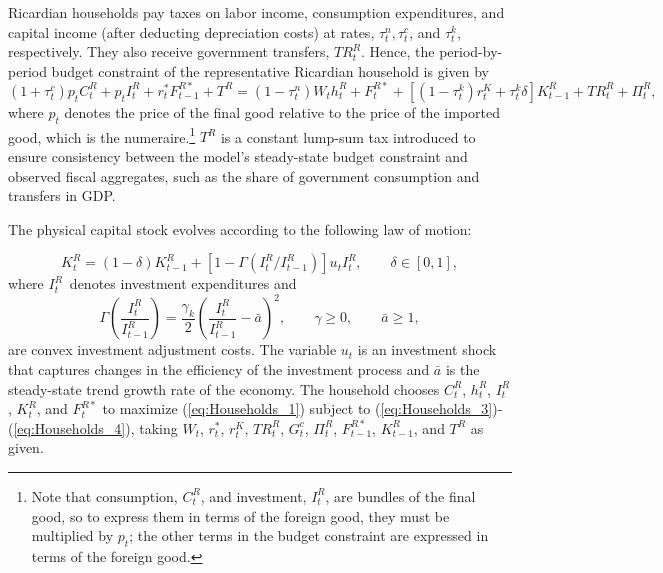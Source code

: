 \documentclass[12pt]{article}
\begin{document}
Ricardian households pay taxes on labor income, consumption expenditures, and capital income (after deducting depreciation costs) at rates, $\tau^n_t, \tau^c_t$, and $\tau^k_t$, respectively. They also receive government transfers, $TR^R_t$. Hence, the period-by-period budget constraint of the representative Ricardian household is given by%
\begin{equation}
(1+\tau^c_t)p_tC^R_{t}+p_tI^R_{t} +r_{t}^{\ast}F^{R\ast}_{t-1} + T^R 
=(1-\tau^n_t)W_{t}h^R_{t}+F^{R*}_t+ \left[(1-\tau^k_t)r_{t}^{K}+\tau^k_t\delta \right]K^R_{t-1} + TR^R_t + \Pi_t^R, %
\label{eq:Households_3}
\end{equation}%
where $p_t$ denotes the price of the final good relative to the price of the imported good, which is the numeraire.\footnote{Note that consumption, $C_t^R$, and investment, $I_t^R$, are bundles of the final good, so to express them in terms of the foreign good, they must be multiplied by $p_t$; the other terms in the budget constraint are expressed in terms of the foreign good.} $T^R$ is a constant lump-sum tax introduced to ensure consistency between the model’s steady-state budget constraint and observed fiscal aggregates, such as the share of government consumption and transfers in GDP.

The physical capital stock evolves according to the following law of motion:

\begin{equation}
K^R_{t}=(1-\delta )K^R_{t-1}+[1-\Gamma \left( I^R_{t}/I^R_{t-1}\right)]u_{t}I^R_{t},\qquad \delta \in [0,1],  \label{eq:Households_4}
\end{equation}%
where $I^R_{t}$\ denotes investment expenditures and%
\begin{equation*}
\Gamma \left( \frac{I^R_{t}}{I^R_{t-1}}\right) =\frac{\gamma_k}{2}\left( \frac{I^R_{t}}{I^R_{t-1}}-\bar{a}\right) ^{2},\qquad \gamma \geq 0,\qquad \bar{a}\geq
1,
\end{equation*}%
are convex investment adjustment costs. The variable $u_{t}$ is an investment shock that captures changes in the efficiency of the investment process \citep[see][]{justiniano2010investment} and $\bar{a}$ is the steady-state trend growth rate of the economy. The household chooses $C^R_{t}$, $h^R_{t}$, $I^R_{t}$, $K^R_{t}$, and $F^{R\ast}_{t}$ to maximize (\ref{eq:Households_1}) subject to (\ref{eq:Households_3})-(\ref{eq:Households_4}), taking $W_{t}$, $r_{t}^{\ast }$, $r_{t}^{K}$, $TR^R_{t}$, $G^c_{t}$, $\Pi_t^R$, $F^{R\ast}_{t-1}$, $K^R_{t-1}$, and $T^R$ as given.  
\end{document}

